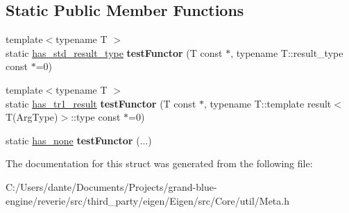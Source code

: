 \subsection*{Static Public Member Functions}
\begin{DoxyCompactItemize}
\item 
\mbox{\label{struct_eigen_1_1internal_1_1result__of_3_01_func_07_arg_type_08_4_adc8f0e3f81babf9ec363150457c5a88b}} 
{\footnotesize template$<$typename T $>$ }\\static \mbox{\hyperlink{struct_eigen_1_1internal_1_1has__std__result__type}{has\+\_\+std\+\_\+result\+\_\+type}} {\bfseries test\+Functor} (T const $\ast$, typename T\+::result\+\_\+type const $\ast$=0)
\item 
\mbox{\label{struct_eigen_1_1internal_1_1result__of_3_01_func_07_arg_type_08_4_aedd18d6980d959a0a6889426c791fea3}} 
{\footnotesize template$<$typename T $>$ }\\static \mbox{\hyperlink{struct_eigen_1_1internal_1_1has__tr1__result}{has\+\_\+tr1\+\_\+result}} {\bfseries test\+Functor} (T const $\ast$, typename T\+::template result$<$ T(Arg\+Type)$>$\+::type const $\ast$=0)
\item 
\mbox{\label{struct_eigen_1_1internal_1_1result__of_3_01_func_07_arg_type_08_4_af6e85180ec6bbd25744ccdcba7382e78}} 
static \mbox{\hyperlink{struct_eigen_1_1internal_1_1has__none}{has\+\_\+none}} {\bfseries test\+Functor} (...)
\end{DoxyCompactItemize}


The documentation for this struct was generated from the following file\+:\begin{DoxyCompactItemize}
\item 
C\+:/\+Users/dante/\+Documents/\+Projects/grand-\/blue-\/engine/reverie/src/third\+\_\+party/eigen/\+Eigen/src/\+Core/util/Meta.\+h\end{DoxyCompactItemize}
